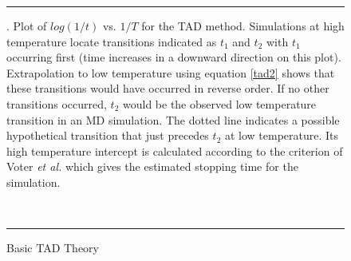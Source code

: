 \begin{figure}[ht]
\hrule
\vspace{1.0cm}
\begin{center}
\centerline{}
\end{center}
\caption{Basic TAD Theory\label{tadfig}}. 
Plot of $log(1/t)$ vs. $1/T$ for the TAD method. Simulations at high
temperature locate transitions indicated as $t_1$ and $t_2$ with $t_1$
occurring first (time increases in a downward direction on this
plot). Extrapolation to low temperature using equation
\ref{tad2} shows that these transitions would have occurred in reverse
order. If no other transitions occurred, $t_2$ would be the observed
low temperature transition in an MD simulation. The dotted line
indicates a possible hypothetical transition that just precedes
$t_2$ at low temperature. Its high temperature intercept is calculated
according to the criterion of Voter {\em et al.} \cite{voter-00a}
which gives the estimated stopping time for the simulation.

~
\hrule
\end{figure}

